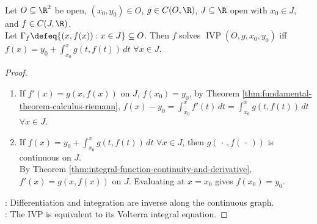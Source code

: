 \begin{proposition} \label{prop:ode-integral-equation-equivalence} \\
Let $O\subseteq\R^2$ be open, $(x_0,y_0)\in O$, $g\in C(O,\R)$, $J\subseteq\R$ open with $x_0\in J$, and $f\in C(J,\R)$.\\
Let $\Gamma_f\defeq\{(x,f(x)):x\in J\}\subseteq O$. Then $f$ solves $\operatorname{IVP}(O,g,x_0,y_0)$ iff $f(x)=y_0+\int_{x_0}^{x}g(t,f(t))\,dt$ $\forall x\in J$.
\begin{proof}
\begin{enumerate}[label=\roman*.]
\setlength{\itemsep}{0pt}
\item[$(\Rightarrow)$] If $f'(x)=g(x,f(x))$ on $J$, $f(x_0)=y_0$, by Theorem \ref{thm:fundamental-theorem-calculus-riemann}, $f(x)-y_0=\int_{x_0}^{x}f'(t)\,dt=\int_{x_0}^{x}g(t,f(t))\,dt$ $\forall x\in J$.
\item[$(\Leftarrow)$] If $f(x)=y_0+\int_{x_0}^{x}g(t,f(t))\,dt$ $\forall x\in J$, then $g(\,\cdot\,,f(\,\cdot\,))$ is continuous on $J$.\\
By Theorem \ref{thm:integral-function-continuity-and-derivative}, $f'(x)=g(x,f(x))$ on $J$. Evaluating at $x=x_0$ gives $f(x_0)=y_0$.
\end{enumerate}
: Differentiation and integration are inverse along the continuous graph.\\
: The IVP is equivalent to its Volterra integral equation.
\end{proof}
\end{proposition}

